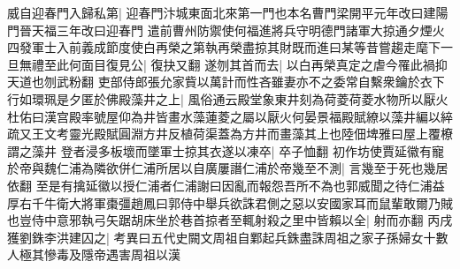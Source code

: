 威自迎春門入歸私第|{
	迎春門汴城東面北來第一門也本名曹門梁開平元年改曰建陽門晉天福三年改曰迎春門}
遣前曹州防禦使何福進將兵守明德門諸軍大掠通夕煙火四發軍士入前義成節度使白再榮之第執再榮盡掠其財既而進曰某等昔嘗趨走麾下一旦無禮至此何面目復見公|{
	復抉又翻}
遂刎其首而去|{
	以白再榮真定之虐今罹此禍抑天道也刎武粉翻}
吏部侍郎張允家貲以萬計而性吝雖妻亦不之委常自繫衆鑰於衣下行如環珮是夕匿於佛殿藻井之上|{
	風俗通云殿堂象東井刻為荷菱荷菱水物所以厭火杜佑曰漢宫殿率號屋仰為井皆畫水藻蓮菱之屬以厭火何晏景福殿賦繚以藻井編以綷疏又王文考靈光殿賦圓淵方井反植荷渠蓋為方井而畫藻其上也陸佃埤雅曰屋上覆橑謂之藻井}
登者浸多板壞而墜軍士掠其衣遂以凍卒|{
	卒子恤翻}
初作坊使賈延徽有寵於帝與魏仁浦為隣欲併仁浦所居以自廣屢譖仁浦於帝幾至不測|{
	言幾至于死也幾居依翻}
至是有擒延徽以授仁浦者仁浦謝曰因亂而報怨吾所不為也郭威聞之待仁浦益厚右千牛衛大將軍棗彊趙鳳曰郭侍中舉兵欲誅君側之惡以安國家耳而鼠輩敢爾乃賊也豈侍中意邪執弓矢踞胡床坐於巷首掠者至輒射殺之里中皆賴以全|{
	射而亦翻}
丙戌獲劉銖李洪建囚之|{
	考異曰五代史闕文周祖自鄴起兵銖盡誅周祖之家子孫婦女十數人極其慘毒及隱帝遇害周祖以漢}


